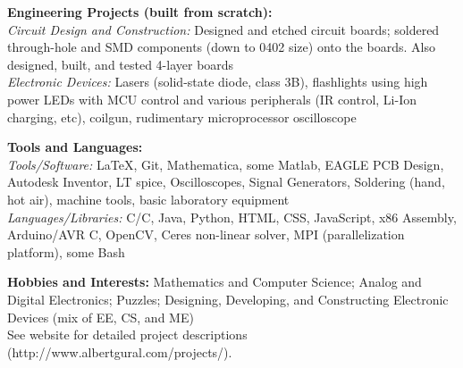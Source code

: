 \documentclass{article}
\newenvironment{changemargin}[2]{%
  \begin{list}{}{%
    \setlength{\topsep}{0pt}%
    \setlength{\leftmargin}{#1}%
    \setlength{\rightmargin}{#2}%
    \setlength{\listparindent}{\parindent}%
    \setlength{\itemindent}{\parindent}%
    \setlength{\parsep}{\parskip}%
  }%
  \item[]}{\end{list}
}
\newenvironment{body} {
	\vspace*{-16pt}
	\begin{changemargin}{-0.25in}{-0.5in}
  }	
	{\end{changemargin}
}
\newcommand{\CC}{C\nolinebreak\hspace{-.05em}\raisebox{.4ex}{\tiny\bf +}\nolinebreak\hspace{-.10em}\raisebox{.4ex}{\tiny\bf +}}
\begin{document}
\begin{body}
	\vspace{14pt}
	\textbf{Engineering Projects (built from scratch):} \\
	\textit{Circuit Design and Construction:} Designed and etched circuit boards; soldered through-hole and SMD components (down to 0402 size) onto the boards.  Also designed, built, and tested 4-layer boards \\
	\textit{Electronic Devices:} Lasers (solid-state diode, class 3B), flashlights using high power LEDs with MCU control and various peripherals (IR control, Li-Ion charging, etc), coilgun, rudimentary microprocessor oscilloscope \\
	
	\medskip

	\textbf{Tools and Languages:} \\
	\textit{Tools/Software:} \LaTeX, Git, Mathematica, some Matlab, EAGLE PCB Design, Autodesk Inventor, LT spice, Oscilloscopes, Signal Generators, Soldering (hand, hot air), machine tools, basic laboratory equipment \\
	\textit{Languages/Libraries:} C/\CC, Java, Python, HTML, CSS, JavaScript, x86 Assembly, Arduino/AVR C, OpenCV, Ceres non-linear solver, MPI (parallelization platform), some Bash \\

	\medskip

	\textbf{Hobbies and Interests:} Mathematics and Computer Science; Analog and Digital Electronics; Puzzles; Designing, Developing, and Constructing Electronic Devices (mix of EE, CS, and ME) \\ See website for detailed project descriptions (http://www.albertgural.com/projects/). \\
\end{body}

\smallskip
\end{document}
